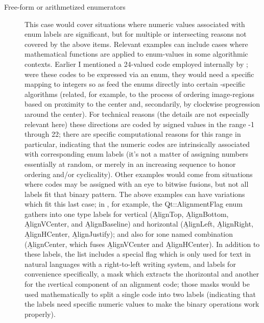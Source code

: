 {\begin{description}
\item[Free-form or arithmetized enumerators]  This
case would cover situations where numeric values associated
with enum labels are significant, but for multiple or
intersecting reasons not covered by the above items.
\> Relevant examples can include cases where mathematical
functions are applied to enum-values in some
algorithmic contexts. \> Earlier I mentioned
a 24-valued  code employed internally
by \XCSD{}; were these codes to be expressed via
an enum, they would need a specific mapping to
integers so as feed the enums directly into
certain \XCSD{}-specific algorithms (related, for
example, to the process of ordering image-regions
based on proximity to the center and, secondarily,
by clockwise progression \i{around} the center).
\> For technical reasons (the details are not
especially relevant here) these directions
are coded by \i{signed} values in the range
-1 through 22; there are specific computational
reasons for this range in particular, indicating
that the numeric codes are intrinsically
associated with corresponding enum labels
(it's not a matter of assigning numbers essentially
at random, or merely in an increasing sequence to
honor ordering and/or cyclicality). \> Other 
examples would come from situations where codes
may be assigned with an eye to bitwise fusions,
but not all labels fit that binary pattern.
\> The above  examples can have variations
which fit this last case; in \Qt{}, for example,
the \b{Qt::AlignmentFlag} enum gathers into one
type labels for vertical (\b{AlignTop}, \b{AlignBottom},
\b{AlignVCenter}, and \b{AlignBaseline}) and
horizontal (\b{AlignLeft}, \b{AlignRight},
\b{AlignHCenter}, \b{AlignJustify}); and also
for \i{one} named combination (\b{AlignCenter},
which fuses \b{AlignVCenter} and \b{AlignHCenter}).
\> In addition to these labels, the list includes
a special flag which is only used for text in
natural languages with a right-to-left writing system,
and  labels for convenience \mdash{} specifically,
a mask which extracts the \i{horizontal} and another
for the \i{vertical} component of an alignment
code; those masks would be used mathematically
to split a single code into two labels (indicating
that the labels need specific numeric values to
make the binary operations work properly).\;\<
\end{description}
}


